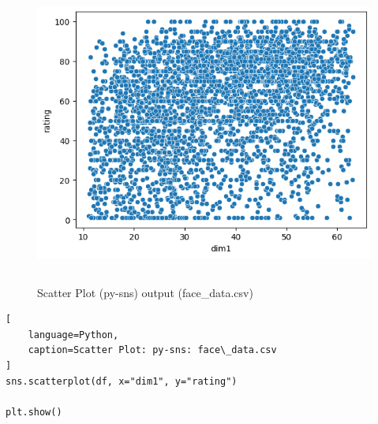\begin{table}[H]
\begin{minipage}[t]{0.35\linewidth}
\begin{figure}[H]
    \centering
    \includegraphics[width=0.9\linewidth, height=10cm, keepaspectratio]{images/data/__visualizations__/sns-scatter-dim1-rating-face-data.png}
    \caption{Scatter Plot (py-sns) output (face\_data.csv)}
\end{figure}
\end{minipage}
\hspace{0.2cm}
\vrule width 1pt
\hspace{0.5cm}
\begin{minipage}[t]{0.57\linewidth}
\begin{lstlisting}[
    language=Python,
    caption=Scatter Plot: py-sns: face\_data.csv
]
sns.scatterplot(df, x="dim1", y="rating")

plt.show()
\end{lstlisting}
\end{minipage}
\end{table}





